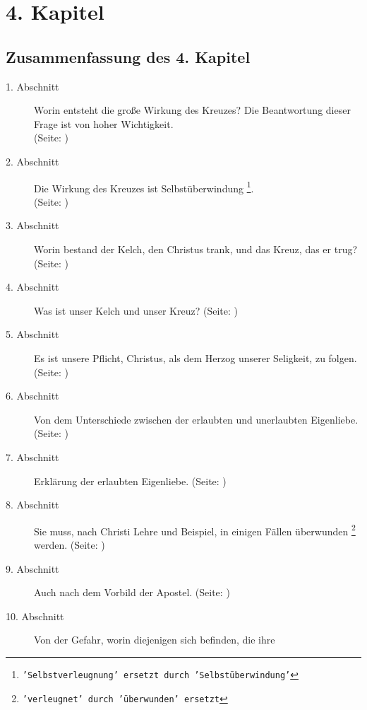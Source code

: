 

\chapter{4. Kapitel} \label{kap4}

\section{Zusammenfassung des 4. Kapitel}
\footnotesize
\begin{description}
\item[1. Abschnitt] Worin entsteht die große Wirkung des Kreuzes? Die
Beantwortung dieser Frage ist von hoher Wichtigkeit.
\\(Seite: \pageref{kap4_ab1})
\item[2. Abschnitt] Die Wirkung des Kreuzes ist Selbstüberwindung
\footnote{\texttt{'Selbstverleugnung' ersetzt durch 'Selbstüberwindung'}}.
\\(Seite: \pageref{kap4_ab2})
\item[3. Abschnitt] Worin bestand der Kelch, den Christus trank, und das Kreuz,
das er trug?
\\(Seite: \pageref{kap4_ab3})
\item[4. Abschnitt]  Was ist unser Kelch und unser Kreuz? (Seite:
\pageref{kap4_ab4})
\item[5. Abschnitt] Es ist unsere Pflicht, Christus, als dem Herzog unserer
Seligkeit, zu folgen. (Seite: \pageref{kap4_ab5})
\item[6. Abschnitt] Von dem Unterschiede zwischen der erlaubten und unerlaubten
Eigenliebe. (Seite: \pageref{kap4_ab6})
\item[7. Abschnitt] Erklärung der erlaubten Eigenliebe. (Seite:
\pageref{kap4_ab7})
\item[8. Abschnitt] Sie muss, nach Christi Lehre und Beispiel, in einigen Fällen
überwunden \footnote{\texttt{'verleugnet' durch 'überwunden' ersetzt}} werden.
(Seite: \pageref{kap4_ab8})
\item[9. Abschnitt] Auch nach dem Vorbild der Apostel. (Seite:
\pageref{kap4_ab9})
\item[10. Abschnitt] Von der Gefahr, worin diejenigen sich befinden, die ihre

\end{description}

